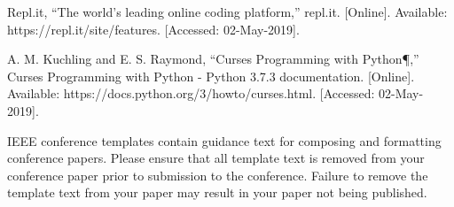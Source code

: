 \documentclass[conference]{IEEEtran}
\begin{document}
\begin{thebibliography}{00}
 Repl.it, “The world's leading online coding platform,” repl.it. [Online]. Available: https://repl.it/site/features. [Accessed: 02-May-2019].

 A. M. Kuchling and E. S. Raymond, “Curses Programming with Python¶,” Curses Programming with Python - Python 3.7.3 documentation. [Online]. Available: https://docs.python.org/3/howto/curses.html. [Accessed: 02-May-2019].

\end{thebibliography}
\vspace{12pt}
\color{red}
IEEE conference templates contain guidance text for composing and formatting conference papers. Please ensure that all template text is removed from your conference paper prior to submission to the conference. Failure to remove the template text from your paper may result in your paper not being published.
\end{document}
